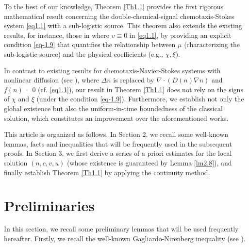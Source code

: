 \documentclass[reqno]{amsart}
\begin{document}
To the best of our knowledge, Theorem \ref{Th1.1} provides the first rigorous 
mathematical result concerning the double-chemical-signal chemotaxis-Stokes system 
\eqref{eq1.1} with a sub-logistic source. This theorem also extends the existing results, 
for instance, those in \cite{ma} where $v\equiv0$ in \eqref{eq1.1}, by providing an 
explicit condition \eqref{eq-1.9} that quantifies the relationship between 
$\mu$ (characterizing the sub-logistic source) and the physical coefficients (e.g., 
$\chi, \xi$).

In contrast to existing results for chemotaxis-Navier-Stokes systems with nonlinear 
diffusion (see \cite{Luo}), where $\Delta n$ is replaced by $\nabla\cdot (D(n)\nabla n)$ 
and $f(n)=0$ (cf. \eqref{eq1.1}), our result in Theorem \ref{Th1.1} does not rely on 
the signs of $\chi$ and $\xi$ (under the condition \eqref{eq-1.9}). Furthermore, 
we establish not only the global existence but also the uniform-in-time boundedness 
of the classical solution, which constitutes an improvement over the aforementioned
 works.

This article is organized as follows. 
In Section 2, we recall some well-known lemmas, facts and inequalities that will be 
frequently used in the subsequent proofs. 
In Section 3, we first derive a series of a priori estimates for the local solution
 \((n,c,v,u)\) (whose existence is guaranteed by Lemma \ref{lm2.8}), and finally 
establish Theorem \ref{Th1.1} by applying the continuity method.

\section{Preliminaries}

In this section, we recall some preliminary lemmas that will be used frequently 
hereafter.
Firstly, we recall the well-known Gagliardo-Nirenberg inequality 
(see \cite{Nirenberg-1959}).
\end{document}
